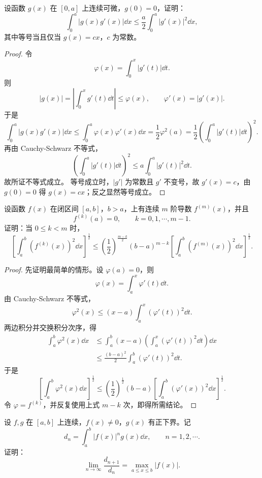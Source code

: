 \begin{problem}
	设函数 $g(x)$ 在 $[0,a]$ 上连续可微，$g(0)=0$，证明：
	\[
	\int_0^a |g(x)g'(x)|\dd x\leqslant \frac a2\int_0^a |g'(x)|^2\dd x,
	\]
	其中等号当且仅当 $g(x)=cx$，$c$ 为常数。
\end{problem}

\begin{proof}
	令
	\[
	\varphi(x)=\int_0^x |g'(t)|\dd t.
	\]
	则
	\[
	|g(x)|=\left|\int_0^x g'(t)\dd t\right|\leqslant \varphi(x),\qquad \varphi'(x)=|g'(x)|.
	\]
	于是
	\[
	\int_0^a |g(x)g'(x)|\dd x
	\leqslant \int_0^a \varphi(x)\varphi'(x)\dd x
	=\frac12\varphi^2(a)
	=\frac12\left(\int_0^a |g'(t)|\dd t\right)^2.
	\]
	再由 Cauchy-Schwarz 不等式，
	\[
	\left(\int_0^a |g'(t)|\dd t\right)^2
	\leqslant a\int_0^a |g'(t)|^2\dd t.
	\]
	故所证不等式成立。
	等号成立时，$|g'|$ 为常数且 $g'$ 不变号，故 $g'(x)=c$，由 $g(0)=0$ 得 $g(x)=cx$；反之显然等号成立。
\end{proof}

\begin{problem}
	设函数 $f(x)$ 在闭区间 $[a,b]$，$b>a$，上有连续 $m$ 阶导数 $f^{(m)}(x)$，并且
	\[
	f^{(k)}(a)=0,
	\qquad k=0,1,\cdots,m-1.
	\]
	证明：当 $0\leqslant k<m$ 时，
	\[
	\left[\int_a^b \left(f^{(k)}(x)\right)^2\dd x\right]^{\frac12}
	\leqslant
	\left(\frac12\right)^{\frac{m-k}{2}}(b-a)^{m-k}
	\left[\int_a^b \left(f^{(m)}(x)\right)^2\dd x\right]^{\frac12}.
	\]
\end{problem}

\begin{proof}
	先证明最简单的情形。设 $\varphi(a)=0$，则
	\[
	\varphi(x)=\int_a^x \varphi'(t)\dd t.
	\]
	由 Cauchy-Schwarz 不等式，
	\[
	\varphi^2(x)\leqslant (x-a)\int_a^x \left(\varphi'(t)\right)^2\dd t.
	\]
	两边积分并交换积分次序，得
	\[
	\begin{aligned}
		\int_a^b \varphi^2(x)\dd x
		&\leqslant \int_a^b (x-a)\left(\int_a^x \left(\varphi'(t)\right)^2\dd t\right)\dd x \\
		&\leqslant \frac{(b-a)^2}{2}\int_a^b \left(\varphi'(t)\right)^2\dd t.
	\end{aligned}
	\]
	于是
	\[
	\left[\int_a^b \varphi^2(x)\dd x\right]^{\frac12}
	\leqslant \left(\frac12\right)^{\frac12}(b-a)
	\left[\int_a^b \left(\varphi'(x)\right)^2\dd x\right]^{\frac12}.
	\]
	令 $\varphi=f^{(k)}$，并反复使用上式 $m-k$ 次，即得所需结论。
\end{proof}

\begin{problem}
	设 $f,g$ 在 $[a,b]$ 上连续，$f(x)\neq 0$，$g(x)$ 有正下界。记
	\[
	d_n=\int_a^b |f(x)|^n g(x)\dd x,
	\qquad n=1,2,\cdots.
	\]
	证明：
	\[
	\lim_{n\to\infty}\frac{d_{n+1}}{d_n}=\max_{a\leqslant x\leqslant b}|f(x)|.
	\]
\end{problem}

